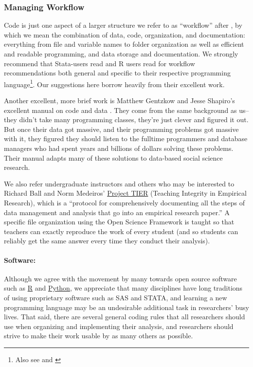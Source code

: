 \documentclass[12pt] {article}
\begin{document}
\subsubsection{Managing Workflow}\label{managing-workflow}

Code is just one aspect of a larger structure we refer to as
``workflow'' after \cite{long_workflow_2008}, by which we mean the
combination of data, code, organization, and documentation: everything
from file and variable names to folder organization as well as efficient
and readable programming, and data storage and documentation. We strongly recommend that Stata-users read \cite{long_workflow_2008} and R users read \cite{gandrud2013reproducible} for workflow recommendations both general and specific to their respective programming language\footnote{Also see and \cite{kirchkamp_workflow_????}}. Our suggestions here borrow heavily from their excellent work. 

Another excellent, more brief work is Matthew Gentzkow and Jesse Shapiro's excellent manual on code and data \href{https://www.brown.edu/Research/Shapiro/pdfs/CodeAndData.pdf}{\citep{GentzkowShapiro}}. They come from the same background as us--they didn't take many programming classes, they're just clever and figured it out. But once their data got massive, and their programming problems got massive with it, they figured they should listen to the fulltime programmers and database managers who had spent years and billions of dollars solving these problems. Their manual adapts many of these solutions to data-based social science research.   

We also refer undergraduate instructors and others who may be interested to Richard Ball and Norm Medeiros' \href{http://www.haverford.edu/TIER/}{Project TIER} (Teaching Integrity in Empirical Research), which is a ``protocol for comprehensively documenting all the steps of data management and analysis that go into an empirical research paper.'' A specific file organization using the Open Science Framework is taught so that teachers can exactly reproduce the work of every student (and so students can reliably get the same answer every time they conduct their analysis). 

\paragraph{Software:}

Although we agree with the movement by many towards open source software such
as \href{http://www.r-project.org/}{R} and \href{https://www.python.org/}{Python}, we appreciate that many disciplines have long
traditions of using proprietary software such as SAS and STATA, and
learning a new programming language may be an undesirable additional
task in researchers' busy lives. That said, there are several general
coding rules that all researchers should use when organizing and
implementing their analysis, and researchers should strive to make their
work usable by as many others as possible.
\end{document}

